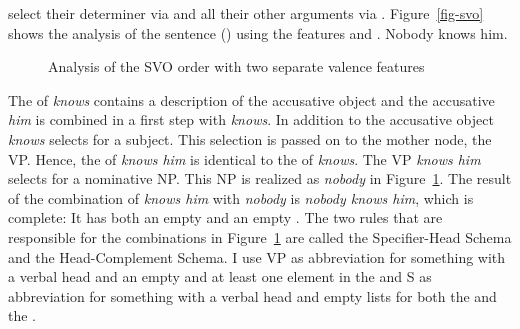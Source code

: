 select their determiner via \spr and all their other arguments via \comps. Figure~\vref{fig-svo}
shows the analysis of the sentence () using the features \spr and \comps.
\ea
Nobody knows him.
\z
\begin{figure}
\caption{\label{fig-svo}Analysis of the SVO order with two separate valence features}
\end{figure}
The \compsl of \emph{knows} contains a description of the accusative object and the accusative
\emph{him} is combined in a first step with \emph{knows}. In addition to the accusative object
\emph{knows} selects for a subject. This selection is passed on to the mother node, the VP. Hence,
the \sprv of \emph{knows him} is identical to the \sprv of \emph{knows}. The VP \emph{knows him}
selects for a nominative NP. This NP is realized as \emph{nobody} in Figure~\ref{fig-svo}. The
result of the combination of \emph{knows him} with \emph{nobody} is \emph{nobody knows him}, which
is complete: It has both an empty \sprl and an empty \compsl. The two rules that are responsible for
the combinations in Figure~\ref{fig-svo} are called the Specifier-Head Schema and the
Head-Complement Schema. I use VP as abbreviation for something with a verbal head and an empty \compsl and at least
one element in the \sprl and S as abbreviation for something with a verbal head and empty lists for
both the \spr and the \compsv.

